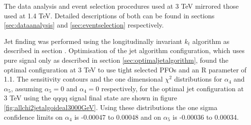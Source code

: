 The data analysis and event selection procedures used at 3 TeV mirrored those used at 1.4 TeV.  Detailed descriptions of both can be found in sections \ref{sec:dataanalysis} and \ref{sec:eventselection} respectively.  

Jet finding was performed using the longitudinally invariant $k_{t}$ algorithm as described in section \label{sec:jetpairing}.  Optimisation of the jet algorithm configuration, which uses pure signal only as described in section \ref{sec:optimaljetalgorithm}, found the optimal configuration at 3 TeV to use tight selected PFOs and an R parameter of 1.1.  The sensitivity contours and the one dimensional $\chi^{2}$ distributions for $\alpha_{4}$ and $\alpha_{5}$, assuming $\alpha_{5} = 0$ and $\alpha_{4} = 0$ respectively, for the optimal jet configuration at 3 TeV using the {\nu}{\nu}qqqq signal final state are shown in figure \ref{fig:allchi2jetalgoideal3000GeV}.  Using these distributions the one sigma confidence limits on $\alpha_{4}$ is -0.00047 to 0.00048 and on $\alpha_{5}$ is -0.00036 to 0.00034.


